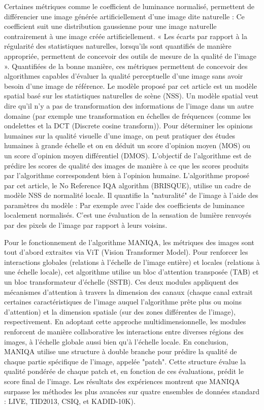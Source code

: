 \documentclass{ieeeaccess}
\begin{document}
 Certaines métriques comme le coefficient de luminance normalisé, permettent de différencier une image générée artificiellement d’une image dite naturelle : Ce coefficient suit une distribution gaussienne pour une image naturelle contrairement à une image créée artificiellement. « Les écarts par rapport à la régularité des statistiques naturelles, lorsqu'ils sont quantifiés de manière appropriée, permettent de concevoir des outils de mesure de la qualité de l'image ». Quantifiées de la bonne manière, ces métriques permettent de concevoir des algorithmes capables d'évaluer la qualité perceptuelle d'une image sans avoir besoin d'une image de référence. Le modèle proposé par cet article est un modèle spatial basé sur les statistiques naturelles de scène (NSS). Un modèle spatial veut dire qu’il n'y a pas de transformation des informations de l'image dans un autre domaine (par exemple une transformation en échelles de fréquences (comme les ondelettes et la DCT (Discrete cosine transform)). Pour déterminer les opinions humaines sur la qualité visuelle d’une image, on peut pratiquer des études humaines à grande échelle et on en déduit un score d’opinion moyen (MOS) ou un score d'opinion moyen différentiel (DMOS). L'objectif de l'algorithme est de prédire les scores de qualité des images de manière à ce que les scores produits par l'algorithme correspondent bien à l'opinion humaine. L’algorithme proposé par cet article, le No Reference IQA algorithm (BRISQUE), utilise un cadre de modèle NSS de normalité locale. Il quantifie la "naturalité" de l’image à l'aide des paramètres du modèle : Par exemple avec l’aide des coefficients de luminance localement normalisés. C'est une évaluation de la sensation de lumière renvoyés par des pixels de l’image par rapport à leurs voisins.

 Pour le fonctionnement de l’algorithme MANIQA, les métriques des images sont tout d’abord extraites via ViT (Vision Transformer Model). Pour renforcer les interactions globales (relations à l’échelle de l’image entière) et locales (relations à une échelle locale), cet algorithme utilise un bloc d'attention transposée (TAB) et un bloc transformateur d'échelle (SSTB). Ces deux modules appliquent des mécanismes d'attention à travers la dimension des canaux (chaque canal extrait certaines caractéristiques de l’image auquel l’algorithme prête plus ou moins d’attention) et la dimension spatiale (sur des zones différentes de l’image), respectivement. En adoptant cette approche multidimensionnelle, les modules renforcent de manière collaborative les interactions entre diverses régions des images, à l'échelle globale aussi bien qu'à l'échelle locale. En conclusion, MANIQA utilise une structure à double branche pour prédire la qualité de chaque partie spécifique de l'image, appelée "patch". Cette structure évalue la qualité pondérée de chaque patch et, en fonction de ces évaluations, prédit le score final de l'image. Les résultats des expériences montrent que MANIQA surpasse les méthodes les plus avancées sur quatre ensembles de données standard : LIVE, TID2013, CSIQ, et KADID-10K). 
\newline
\newline
\newline
\end{document}
